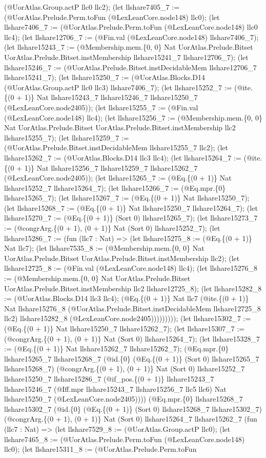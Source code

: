 \documentclass[11pt]{article}
\begin{document}
(@UorAtlas.Group.actP llc0 llc2); (let llshare7405\_7 := (@UorAtlas.Prelude.Perm.toFun (@LexLeanCore.node148) llc0); (let llshare7406\_7 := (@UorAtlas.Prelude.Perm.toFun (@LexLeanCore.node148) llc0 llc4); (let llshare12706\_7 := (@Fin.val (@LexLeanCore.node148) llshare7406\_7); (let llshare15243\_7 := (@Membership.mem.\{0, 0\} Nat UorAtlas.Prelude.Bitset UorAtlas.Prelude.Bitset.instMembership llshare15241\_7 llshare12706\_7); (let llshare15246\_7 := (@UorAtlas.Prelude.Bitset.instDecidableMem llshare12706\_7 llshare15241\_7); (let llshare15250\_7 := (@UorAtlas.Blocks.D14 (@UorAtlas.Group.actP llc0 llc3) llshare7406\_7); (let llshare15252\_7 := (@ite.\{(0 + 1)\} Nat llshare15243\_7 llshare15246\_7 llshare15250\_7 (@LexLeanCore.node2405)); (let llshare15255\_7 := (@Fin.val (@LexLeanCore.node148) llc4); (let llshare15256\_7 := (@Membership.mem.\{0, 0\} Nat UorAtlas.Prelude.Bitset UorAtlas.Prelude.Bitset.instMembership llc2 llshare15255\_7); (let llshare15259\_7 := (@UorAtlas.Prelude.Bitset.instDecidableMem llshare15255\_7 llc2); (let llshare15262\_7 := (@UorAtlas.Blocks.D14 llc3 llc4); (let llshare15264\_7 := (@ite.\{(0 + 1)\} Nat llshare15256\_7 llshare15259\_7 llshare15262\_7 (@LexLeanCore.node2405)); (let llshare15265\_7 := (@Eq.\{(0 + 1)\} Nat llshare15252\_7 llshare15264\_7); (let llshare15266\_7 := (@Eq.mpr.\{0\} llshare15265\_7); (let llshare15267\_7 := (@Eq.\{(0 + 1)\} Nat llshare15250\_7); (let llshare15268\_7 := (@Eq.\{(0 + 1)\} Nat llshare15250\_7 llshare15264\_7); (let llshare15270\_7 := (@Eq.\{(0 + 1)\} (Sort 0) llshare15265\_7); (let llshare15273\_7 := (@congrArg.\{(0 + 1), (0 + 1)\} Nat (Sort 0) llshare15252\_7); (let llshare15286\_7 := (fun (llc7 : Nat) => (let llshare15275\_8 := (@Eq.\{(0 + 1)\} Nat llc7); (let llshare7535\_8 := (@Membership.mem.\{0, 0\} Nat UorAtlas.Prelude.Bitset UorAtlas.Prelude.Bitset.instMembership llc2); (let llshare12725\_8 := (@Fin.val (@LexLeanCore.node148) llc4); (let llshare15276\_8 := (@Membership.mem.\{0, 0\} Nat UorAtlas.Prelude.Bitset UorAtlas.Prelude.Bitset.instMembership llc2 llshare12725\_8); (let llshare15282\_8 := (@UorAtlas.Blocks.D14 llc3 llc4); (@Eq.\{(0 + 1)\} Nat llc7 (@ite.\{(0 + 1)\} Nat llshare15276\_8 (@UorAtlas.Prelude.Bitset.instDecidableMem llshare12725\_8 llc2) llshare15282\_8 (@LexLeanCore.node2405))))))))); (let llshare15302\_7 := (@Eq.\{(0 + 1)\} Nat llshare15250\_7 llshare15262\_7); (let llshare15307\_7 := (@congrArg.\{(0 + 1), (0 + 1)\} Nat (Sort 0) llshare15264\_7); (let llshare15328\_7 := (@Eq.\{(0 + 1)\} Nat llshare15262\_7 llshare15262\_7); (@Eq.mpr.\{0\} llshare15265\_7 llshare15268\_7 (@id.\{0\} (@Eq.\{(0 + 1)\} (Sort 0) llshare15265\_7 llshare15268\_7) (@congrArg.\{(0 + 1), (0 + 1)\} Nat (Sort 0) llshare15252\_7 llshare15250\_7 llshare15286\_7 (@if\_pos.\{(0 + 1)\} llshare15243\_7 llshare15246\_7 (@Iff.mpr llshare15243\_7 llshare15256\_7 llc5 llc6) Nat llshare15250\_7 (@LexLeanCore.node2405)))) (@Eq.mpr.\{0\} llshare15268\_7 llshare15302\_7 (@id.\{0\} (@Eq.\{(0 + 1)\} (Sort 0) llshare15268\_7 llshare15302\_7) (@congrArg.\{(0 + 1), (0 + 1)\} Nat (Sort 0) llshare15264\_7 llshare15262\_7 (fun (llc7 : Nat) => (let llshare7529\_8 := (@UorAtlas.Group.actP llc0); (let llshare7465\_8 := (@UorAtlas.Prelude.Perm.toFun (@LexLeanCore.node148) llc0); (let llshare15311\_8 := (@UorAtlas.Prelude.Perm.toFun 
\end{document}
